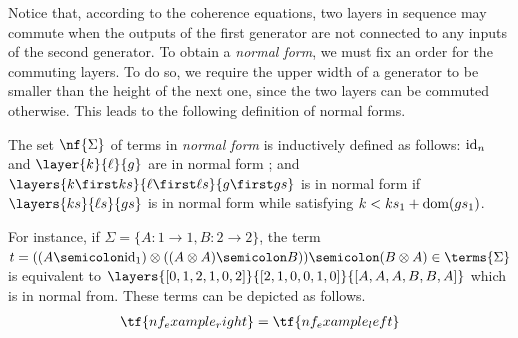 Notice that, according to the coherence equations, two layers in sequence may commute when the outputs of the first generator are not connected to any inputs of the second generator. To obtain a \emph{normal form}, we must fix an order for the commuting layers. To do so, we require the upper width of a generator to be smaller than the height of the next one, since the two layers can be commuted otherwise. This leads to the following definition of normal forms.

\begin{definition}\label{def:nf}
    The set $\nf{\Sigma}$ of terms in \emph{normal form} is inductively defined as follows: $\textup{id}_n$ and $\layer{k}{\ell}{g}$ are in normal form ; and $\layers{k\first ks}{\ell\first \ell s}{g\first gs}$ is in normal form if $\layers{ks}{\ell s}{gs}$ is in normal form while satisfying $k<ks_1+\textup{dom}(gs_1)$.
\end{definition}

\begin{example} 
    For instance, if $\Sigma=\{A:1\to1,B:2\to2\}$, the term $t=((A\semicolon\textup{id}_1)\otimes ((A\otimes A)\semicolon B))\semicolon(B\otimes A)\in\terms{\Sigma}$ is equivalent to $\layers{[0,1,2,1,0,2]}{[2,1,0,0,1,0]}{[A,A,A,B,B,A]}$ which is in normal from. These terms can be depicted as follows.
    \begin{gather*}
        \tf{nf_example_right} = \tf{nf_example_left}
    \end{gather*}
\end{example}

